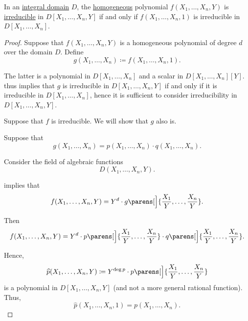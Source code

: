 \begin{proposition}\label{thm:homogeneous_polynomial_constant}
  In an \hyperref[def:integral_domain]{integral domain} \( D \), the \hyperref[def:homogeneous_polynomial]{homogeneous} polynomial \( f(X_1, \ldots, X_n, Y) \) is \hyperref[def:domain_divisibility/irreducible]{irreducible} in \( D[X_1, \ldots, X_n, Y] \) if and only if \( f(X_1, \ldots, X_n, 1) \) is irreducible in \( D[X_1, \ldots, X_n] \).
\end{proposition}
\begin{proof}
  Suppose that \( f(X_1, \ldots, X_n, Y) \) is a homogeneous polynomial of degree \( d \) over the domain \( D \). Define
  \begin{equation*}
    g(X_1, \ldots, X_n) \coloneqq f(X_1, \ldots, X_n, 1).
  \end{equation*}

  The latter is a polynomial in \( D[X_1, \ldots, X_n] \) and a scalar in \( D[X_1, \ldots, X_n][Y] \).  thus implies that \( g \) is irreducible in \( D[X_1, \ldots, X_n, Y] \) if and only if it is irreducible in \( D[X_1, \ldots, X_n] \), hence it is sufficient to consider irreducibility in \( D[X_1, \ldots, X_n, Y] \).

  \SufficiencySubProof Suppose that \( f \) is irreducible. We will show that \( g \) also is.

  Suppose that
  \begin{equation*}
    g(X_1, \ldots, X_n) = p(X_1, \ldots, X_n) \cdot q(X_1, \ldots, X_n).
  \end{equation*}

  Consider the field of algebraic functions
  \begin{equation*}
    D(X_1, \ldots, X_n, Y).
  \end{equation*}

   implies that
  \begin{equation*}
    f(X_1, \ldots, X_n, Y) = Y^d \cdot g\parens[\Big]{ \frac {X_1} Y, \ldots, \frac {X_n} Y }.
  \end{equation*}

  Then
  \begin{equation*}
    f(X_1, \ldots, X_n, Y) = Y^d \cdot p\parens[\Big]{ \frac {X_1} Y, \ldots, \frac {X_n} Y } \cdot q\parens[\Big]{ \frac {X_1} Y, \ldots, \frac {X_n} Y }.
  \end{equation*}

  Hence,
  \begin{equation*}
    \widehat{p}(X_1, \ldots, X_n, Y) \coloneqq Y^{\deg p} \cdot p\parens[\Big]{ \frac {X_1} Y, \ldots, \frac {X_n} Y }
  \end{equation*}
  is a polynomial in \( D[X_1, \ldots, X_n, Y] \) (and not a more general rational function). Thus,
  \begin{equation*}
    \widehat{p}(X_1, \ldots, X_n, 1) = p(X_1, \ldots, X_n).
  \end{equation*}


\end{proof}
